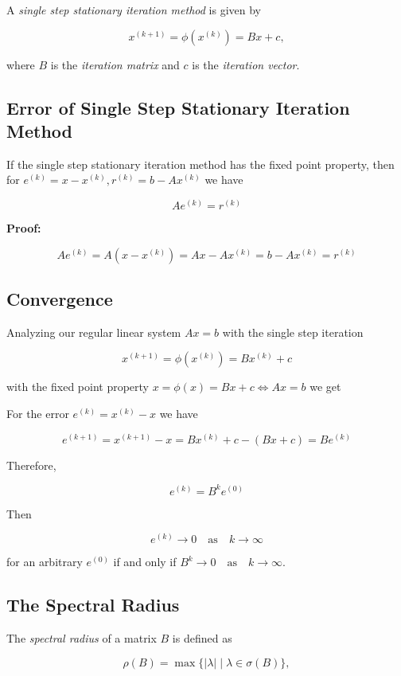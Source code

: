 A \emph{single step stationary iteration method} is given by 

\[
    x^{(k + 1)} = \phi(x^{(k)}) = Bx + c,
\]

where \(B\) is the \emph{iteration matrix} and \(c\) is the \emph{iteration vector}.

\subsection{Error of Single Step Stationary Iteration Method}

If the single step stationary iteration method has the fixed point property, then for 
\(e^{(k)} = x - x^{(k)}, r^{(k)} = b - Ax^{(k)}\) we have

\[
    Ae^{(k)} = r^{(k)}
\]

\textbf{Proof:}

\[
    Ae^{(k)} = A(x - x^{(k)}) = Ax - Ax^{(k)} = b - Ax^{(k)} = r^{(k)}
\]

\QED

\subsection{Convergence}

Analyzing our regular linear system \(Ax = b\) with the single step iteration 

\[
    x^{(k + 1)} = \phi(x^{(k)}) = Bx^{(k)} + c
\]

with the fixed point property \(x = \phi(x) = Bx + c \iff Ax = b\) we get

For the error \(e^{(k)} = x^{(k)} - x\) we have 

\[
    e^{(k + 1)} = x^{(k + 1)} - x = Bx^{(k)} + c - (Bx + c) = Be^{(k)}
\]

Therefore, 

\[
    e^{(k)} = B^k e^{(0)}
\]

Then 

\[
    e^{(k)} \to 0 \quad \text{as} \quad k \to \infty
\]

for an arbitrary \(e^{(0)}\) if and only if \(B^k \to 0 \quad \text{as} \quad k \to \infty\).

\subsection{The Spectral Radius}

The \emph{spectral radius} of a matrix \(B\) is defined as
 
\[
    \rho(B) = \max\{|\lambda| \mid \lambda \in \sigma(B)\},
\]

